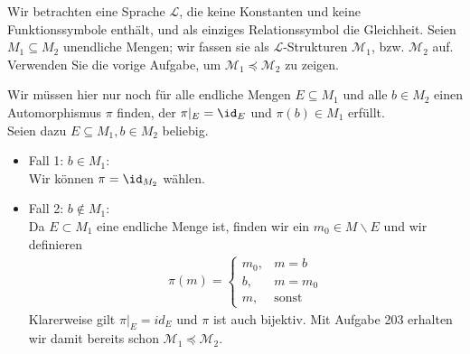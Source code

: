 
\begin{exercise}[204]

Wir betrachten eine Sprache $\mathscr{L}$, die keine Konstanten und keine
Funktionssymbole enthält, und als einziges Relationssymbol die Gleichheit.
Seien $M_1 \subseteq M_2$ unendliche Mengen; wir fassen sie als $\mathscr{L}$-Strukturen
$\mathscr{M}_1$, bzw. $\mathscr{M}_2$ auf. Verwenden Sie die vorige Aufgabe,
um $\mathscr{M}_1 \preccurlyeq \mathscr{M}_2$ zu zeigen.

\end{exercise}


\begin{solution}

Wir müssen hier nur noch für alle endliche Mengen $E \subseteq M_1$ und alle $b \in M_2$
einen Automorphismus $\pi$ finden, der $\pi|_E = \id_E$ und $\pi(b) \in M_1$ erfüllt. \\
Seien dazu $E \subseteq M_1, b \in M_2$ beliebig.
\begin{itemize}
  \item Fall 1: $b \in M_1$: \\
  Wir können $\pi = \id_{M_2}$ wählen.
  \item Fall 2: $b \notin M_1$: \\
  Da $E \subset M_1$ eine endliche Menge ist, finden wir ein $m_0 \in M\backslash E$ und
  wir definieren
  \begin{align*}
    \pi(m) = \begin{cases}
      m_0, & m = b \\
      b, & m = m_0 \\
      m, & \text{sonst}
    \end{cases}
  \end{align*}
  Klarerweise gilt $\pi|_E = id_E$ und $\pi$ ist auch bijektiv.
  Mit Aufgabe 203 erhalten wir damit bereits schon $\mathscr{M}_1 \preccurlyeq \mathscr{M}_2$.
\end{itemize}
\end{solution}
